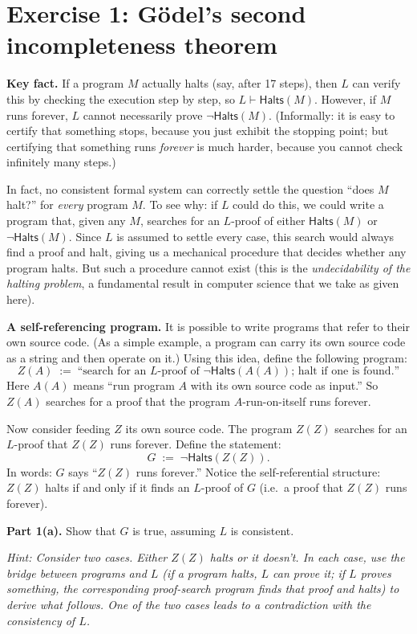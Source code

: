 \documentclass[8pt]{article}
\begin{document}
\section{Exercise 1: G\"odel's second incompleteness theorem}

\noindent
\textbf{Key fact.} If a program $M$ actually halts (say, after 17 steps), then $L$ can
verify this by checking the execution step by step, so $L \vdash \mathsf{Halts}(M)$.
However, if $M$ runs forever, $L$ cannot necessarily prove
$\neg\mathsf{Halts}(M)$. (Informally: it is easy to certify that something stops, because
you just exhibit the stopping point; but certifying that something runs \emph{forever}
is much harder, because you cannot check infinitely many steps.)

\medskip
\noindent
In fact, no consistent formal system can correctly settle the question ``does $M$ halt?''
for \emph{every} program $M$. To see why: if $L$ could do this, we could write a program
that, given any $M$, searches for an $L$-proof of either $\mathsf{Halts}(M)$ or
$\neg\mathsf{Halts}(M)$. Since $L$ is assumed to settle every case, this search would
always find a proof and halt, giving us a mechanical procedure that decides whether
any program halts. But such a procedure cannot exist (this is the \emph{undecidability
of the halting problem}, a fundamental result in computer science that we take as
given here).

\medskip
\noindent
\textbf{A self-referencing program.} It is possible to write programs that refer to
their own source code. (As a simple example, a program can carry its own source code
as a string and then operate on it.) Using this idea, define the following program:
\[
  Z(A) \;:=\; \text{``search for an $L$-proof of
  $\neg\mathsf{Halts}(A(A))$; halt if one is found.''}
\]
Here $A(A)$ means ``run program $A$ with its own source code as input.'' So $Z(A)$
searches for a proof that the program $A$-run-on-itself runs forever.

\medskip
\noindent
Now consider feeding $Z$ its own source code. The program $Z(Z)$ searches for an
$L$-proof that $Z(Z)$ runs forever. Define the statement:
\[
  G \;:=\; \neg\mathsf{Halts}(Z(Z)).
\]
In words: $G$ says ``$Z(Z)$ runs forever.'' Notice the self-referential
structure: $Z(Z)$ halts if and only if it finds an $L$-proof of $G$ (i.e.\ a proof that
$Z(Z)$ runs forever).

\medskip
\noindent
\textbf{Part 1(a).} Show that $G$ is true, assuming $L$ is consistent.

\medskip
\noindent
\emph{Hint: Consider two cases. Either $Z(Z)$ halts or it doesn't. In each case, use
the bridge between programs and $L$ (if a program halts, $L$ can prove it; if $L$
proves something, the corresponding proof-search program finds that proof and halts)
to derive what follows. One of the two cases leads to a contradiction with the
consistency of $L$.}
\end{document}
